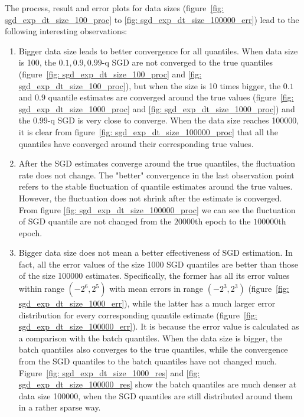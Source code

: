 The process, result and error plots for data sizes (figure~\ref{fig: sgd_exp_dt_size_100_proc} to \ref{fig: sgd_exp_dt_size_100000_err}) lead to the following interesting observations:
\begin{enumerate}
    \item Bigger data size leads to better convergence for all quantiles. When data size is 100, the $0.1, 0.9, 0.99$-q SGD are not converged to the true quantiles (figure~\ref{fig: sgd_exp_dt_size_100_proc} and \ref{fig: sgd_exp_dt_size_100_proc}), but when the size is 10 times bigger, the $0.1$ and $0.9$ quantile estimates are converged around the true values (figure~\ref{fig: sgd_exp_dt_size_1000_proc} and \ref{fig: sgd_exp_dt_size_1000_proc}) and the $0.99$-q SGD is very close to converge. When the data size reaches 100000, it is clear from figure~\ref{fig: sgd_exp_dt_size_100000_proc} that all the quantiles have converged around their corresponding true values.
    
    \item After the SGD estimates converge around the true quantiles, the fluctuation rate does not change. The "better" convergence in the last observation point refers to the stable fluctuation of quantile estimates around the true values. However, the fluctuation does not shrink after the estimate is converged. From figure \ref{fig: sgd_exp_dt_size_100000_proc} we can see the fluctuation of SGD quantile are not changed from the $20000$th epoch to the $100000$th epoch.
    
    \item Bigger data size does not mean a better effectiveness of SGD estimation. In fact, all the error values of the size 1000 SGD quantiles are better than those of the size 100000 estimates. Specifically, the former has all its error values within range $(-2^6, 2^5)$ with mean errors in range $(-2^3, 2^3)$ (figure~\ref{fig: sgd_exp_dt_size_1000_err}), while the latter has a much larger error distribution for every corresponding quantile estimate (figure~\ref{fig: sgd_exp_dt_size_100000_err}). It is because the error value is calculated as a comparison with the batch quantiles. When the data size is bigger, the batch quantiles also converges to the true quantiles, while the convergence from the SGD quantiles to the batch quantiles have not changed much. Figure~\ref{fig: sgd_exp_dt_size_1000_res} and \ref{fig: sgd_exp_dt_size_100000_res} show the batch quantiles are much denser at data size 100000, when the SGD quantiles are still distributed around them in a rather sparse way.
\end{enumerate}
